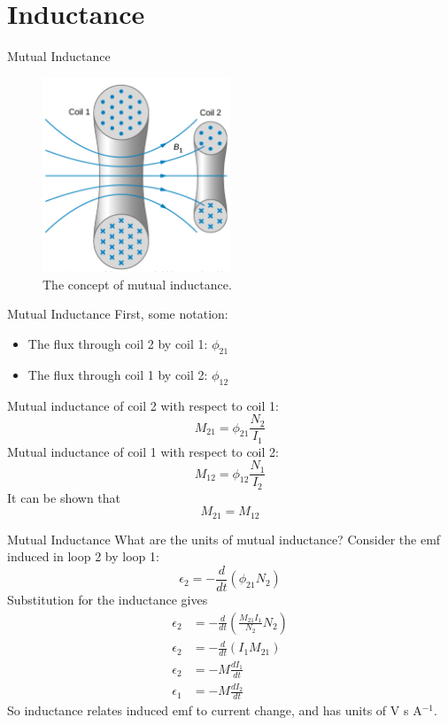 \documentclass{beamer}
\begin{document}
\section{Inductance}

\begin{frame}{Mutual Inductance}
\small
\begin{figure}
\centering
\includegraphics[width=0.5\textwidth]{figures/ind1.png}
\caption{\label{fig:ind1} The concept of mutual inductance.}
\end{figure}
\end{frame}

\begin{frame}{Mutual Inductance}
First, some notation:
\begin{itemize}
\item The flux through coil 2 by coil 1: $\phi_{21}$
\item The flux through coil 1 by coil 2: $\phi_{12}$
\end{itemize}
Mutual inductance of coil 2 with respect to coil 1:
\begin{equation}
M_{21} = \phi_{21}\frac{N_2}{I_1}
\end{equation}
Mutual inductance of coil 1 with respect to coil 2:
\begin{equation}
M_{12} = \phi_{12}\frac{N_1}{I_2}
\end{equation}
It can be shown that
\begin{equation}
\boxed{
M_{21} = M_{12}
}
\end{equation}
\end{frame}

\begin{frame}{Mutual Inductance}
What are the units of mutual inductance?   Consider the emf induced in loop 2 by loop 1:
\begin{equation}
\epsilon_2 = -\frac{d}{dt} \left( \phi_{21} N_2 \right)
\end{equation}
Substitution for the inductance gives
\begin{align}
\epsilon_2 &= -\frac{d}{dt} \left( \frac{M_{21} I_1}{N_2} N_2 \right) \\
\epsilon_2 &= - \frac{d}{dt} \left( I_1 M_{21}\right) \\
\epsilon_2 &= - M \frac{d I_1}{dt} \\
\epsilon_1 &= - M \frac{d I_2}{dt}
\end{align}
So inductance relates induced emf to current change, and has units of V s A$^{-1}$.
\end{frame}
\end{document}
